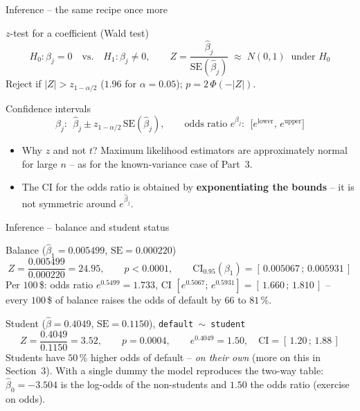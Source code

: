 \documentclass[aspectratio=169,11pt]{beamer}
\begin{document}
\begin{frame}{Inference -- the same recipe once more}
  \begin{block}{$z$-test for a coefficient (Wald test)}
    \[
      H_0:\beta_j=0\quad\text{vs.}\quad H_1:\beta_j\neq0,
      \qquad
      Z=\frac{\hat\beta_j}{\mathrm{SE}(\hat\beta_j)}\;\approx\;N(0,1)\ \text{ under }H_0
    \]
    Reject if $|Z|>z_{1-\alpha/2}$ ($1.96$ for $\alpha=0.05$); $p=2\,\Phi(-|Z|)$.
  \end{block}
  \begin{block}{Confidence intervals}
    \[
      \beta_j:\ \ \hat\beta_j\pm z_{1-\alpha/2}\,\mathrm{SE}(\hat\beta_j),
      \qquad
      \text{odds ratio } e^{\beta_j}:\ \ \bigl[e^{\text{lower}},\,e^{\text{upper}}\bigr]
    \]
  \end{block}
  \begin{itemize}\setlength{\itemsep}{2pt}
    \item Why $z$ and not $t$? Maximum likelihood estimators are
          approximately normal for large $n$ -- as for the known-variance
          case of Part~3.
    \item The CI for the odds ratio is obtained by \textbf{exponentiating
          the bounds} -- it is not symmetric around $e^{\hat\beta_j}$.
  \end{itemize}
\end{frame}

\begin{frame}{Inference -- balance and student status}
  \begin{exampleblock}{Balance ($\hat\beta_1=0.005499$, $\mathrm{SE}=0.000220$)}
    \[
      Z=\frac{0.005499}{0.000220}=24.95,\qquad p<0.0001,\qquad
      \text{CI}_{0.95}(\beta_1)=[\,0.005067\,;\,0.005931\,]
    \]
    Per $100$\,\$: odds ratio $e^{0.5499}=1.733$, CI
    $[e^{0.5067};\,e^{0.5931}]=[\,1.660\,;\,1.810\,]$ -- every $100$\,\$ of
    balance raises the odds of default by $66$ to $81\,\%$.
  \end{exampleblock}
  \begin{exampleblock}{Student ($\hat\beta=0.4049$, $\mathrm{SE}=0.1150$), \texttt{default $\sim$ student}}
    \[
      Z=\frac{0.4049}{0.1150}=3.52,\qquad p=0.0004,\qquad
      e^{0.4049}=1.50,\quad \text{CI}=[\,1.20\,;\,1.88\,]
    \]
    Students have $50\,\%$ higher odds of default -- \emph{on their own}
    (more on this in Section~3). With a single dummy the model reproduces
    the two-way table: $\hat\beta_0=-3.504$ is the log-odds of the
    non-students and $1.50$ the odds ratio (exercise on odds).
  \end{exampleblock}
\end{frame}
\end{document}
